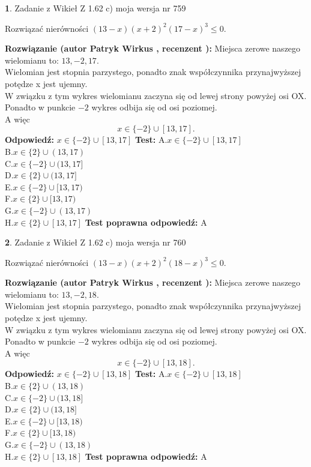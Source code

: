\documentclass[12pt, a4paper]{article}
\theoremstyle{definition} %
\newtheorem{zad}{}
\newcommand{\zadStart}[1]{\begin{zad}#1\newline}
\newcommand{\zadStop}{\end{zad}}
\newcommand{\rozwStart}[2]{\noindent \textbf{Rozwiązanie (autor #1 , recenzent #2): }\newline}
\newcommand{\rozwStop}{\newline}
\newcommand{\odpStart}{\noindent \textbf{Odpowiedź:}\newline}
\newcommand{\odpStop}{\newline}
\newcommand{\testStart}{\noindent \textbf{Test:}\newline}
\newcommand{\testStop}{\newline}
\newcommand{\kluczStart}{\noindent \textbf{Test poprawna odpowiedź:}\newline}
\newcommand{\kluczStop}{\newline}
\begin{document}
\zadStart{Zadanie z Wikieł Z 1.62 c) moja wersja nr 759}

Rozwiązać nierówności $(13-x)(x+2)^{2}(17-x)^{3}\le0$.
\zadStop
\rozwStart{Patryk Wirkus}{}
Miejsca zerowe naszego wielomianu to: $13, -2, 17$.\\
Wielomian jest stopnia parzystego, ponadto znak współczynnika przy\linebreak najwyższej potędze x jest ujemny.\\ W związku z tym wykres wielomianu zaczyna się od lewej strony powyżej osi OX.\\
Ponadto w punkcie $-2$ wykres odbija się od osi poziomej.\\
A więc $$x \in \{-2\} \cup [13,17].$$
\rozwStop
\odpStart
$x \in \{-2\} \cup [13,17]$
\odpStop
\testStart
A.$x \in \{-2\} \cup [13,17]$\\
B.$x \in \{2\} \cup (13,17)$\\
C.$x \in \{-2\} \cup (13,17]$\\
D.$x \in \{2\} \cup (13,17]$\\
E.$x \in \{-2\} \cup [13,17)$\\
F.$x \in \{2\} \cup [13,17)$\\
G.$x \in \{-2\} \cup (13,17)$\\
H.$x \in \{2\} \cup [13,17]$
\testStop
\kluczStart
A
\kluczStop



\zadStart{Zadanie z Wikieł Z 1.62 c) moja wersja nr 760}

Rozwiązać nierówności $(13-x)(x+2)^{2}(18-x)^{3}\le0$.
\zadStop
\rozwStart{Patryk Wirkus}{}
Miejsca zerowe naszego wielomianu to: $13, -2, 18$.\\
Wielomian jest stopnia parzystego, ponadto znak współczynnika przy\linebreak najwyższej potędze x jest ujemny.\\ W związku z tym wykres wielomianu zaczyna się od lewej strony powyżej osi OX.\\
Ponadto w punkcie $-2$ wykres odbija się od osi poziomej.\\
A więc $$x \in \{-2\} \cup [13,18].$$
\rozwStop
\odpStart
$x \in \{-2\} \cup [13,18]$
\odpStop
\testStart
A.$x \in \{-2\} \cup [13,18]$\\
B.$x \in \{2\} \cup (13,18)$\\
C.$x \in \{-2\} \cup (13,18]$\\
D.$x \in \{2\} \cup (13,18]$\\
E.$x \in \{-2\} \cup [13,18)$\\
F.$x \in \{2\} \cup [13,18)$\\
G.$x \in \{-2\} \cup (13,18)$\\
H.$x \in \{2\} \cup [13,18]$
\testStop
\kluczStart
A
\kluczStop
\end{document}
